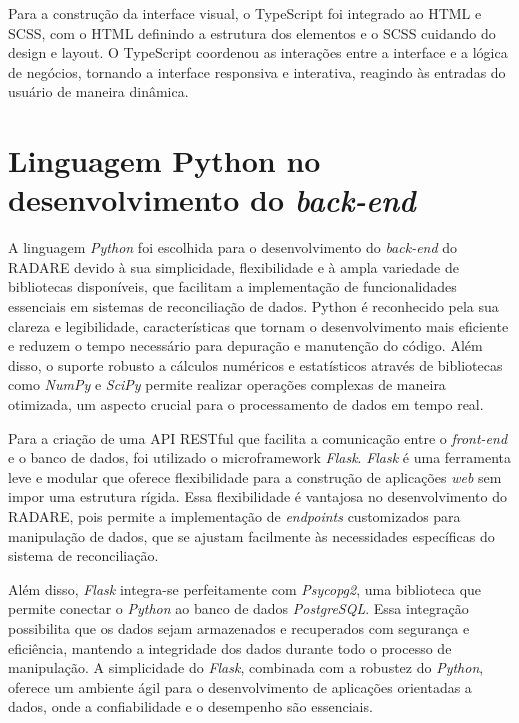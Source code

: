 Para a construção da interface visual, o TypeScript foi integrado ao HTML e SCSS, com o HTML definindo a estrutura dos elementos e o SCSS cuidando do design e layout. O TypeScript coordenou as interações entre a interface e a lógica de negócios, tornando a interface responsiva e interativa, reagindo às entradas do usuário de maneira dinâmica.

\section{Linguagem Python no desenvolvimento do \textit{back-end}}

A linguagem \textit{Python} foi escolhida para o desenvolvimento do \textit{back-end} do RADARE devido à sua simplicidade, flexibilidade e à ampla variedade de bibliotecas disponíveis, que facilitam a implementação de funcionalidades essenciais em sistemas de reconciliação de dados. Python é reconhecido pela sua clareza e legibilidade, características que tornam o desenvolvimento mais eficiente e reduzem o tempo necessário para depuração e manutenção do código. Além disso, o suporte robusto a cálculos numéricos e estatísticos através de bibliotecas como \textit{NumPy} e \textit{SciPy} permite realizar operações complexas de maneira otimizada, um aspecto crucial para o processamento de dados em tempo real.

Para a criação de uma API RESTful que facilita a comunicação entre o \textit{front-end} e o banco de dados, foi utilizado o microframework \textit{Flask}. \textit{Flask} é uma ferramenta leve e modular que oferece flexibilidade para a construção de aplicações \textit{web} sem impor uma estrutura rígida. Essa flexibilidade é vantajosa no desenvolvimento do RADARE, pois permite a implementação de \textit{endpoints} customizados para manipulação de dados, que se ajustam facilmente às necessidades específicas do sistema de reconciliação.

Além disso, \textit{Flask} integra-se perfeitamente com \textit{Psycopg2}, uma biblioteca que permite conectar o \textit{Python} ao banco de dados \textit{PostgreSQL}. Essa integração possibilita que os dados sejam armazenados e recuperados com segurança e eficiência, mantendo a integridade dos dados durante todo o processo de manipulação. A simplicidade do \textit{Flask}, combinada com a robustez do \textit{Python}, oferece um ambiente ágil para o desenvolvimento de aplicações orientadas a dados, onde a confiabilidade e o desempenho são essenciais.

